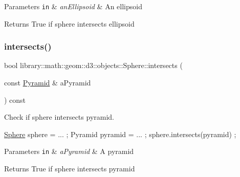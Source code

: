 \begin{DoxyParams}[1]{Parameters}
\mbox{\tt in}  & {\em an\+Ellipsoid} & An ellipsoid \\
\hline
\end{DoxyParams}
\begin{DoxyReturn}{Returns}
True if sphere intersects ellipsoid 
\end{DoxyReturn}
\mbox{\label{classlibrary_1_1math_1_1geom_1_1d3_1_1objects_1_1_sphere_a698e81554ca85819741fdfdcd123e8a1}} 
\subsubsection{\texorpdfstring{intersects()}{intersects()}\hspace{0.1cm}{\footnotesize\ttfamily [8/9]}}
{\footnotesize\ttfamily bool library\+::math\+::geom\+::d3\+::objects\+::\+Sphere\+::intersects (\begin{DoxyParamCaption}\item[{const \hyperlink{classlibrary_1_1math_1_1geom_1_1d3_1_1objects_1_1_pyramid}{Pyramid} \&}]{a\+Pyramid }\end{DoxyParamCaption}) const}



Check if sphere intersects pyramid. 


\begin{DoxyCode}
\hyperlink{classlibrary_1_1math_1_1geom_1_1d3_1_1objects_1_1_sphere_a55dccc8ea16ee55cd7694c26afa8ea39}{Sphere} sphere = ... ;
Pyramid pyramid = ... ;
sphere.intersects(pyramid) ;
\end{DoxyCode}



\begin{DoxyParams}[1]{Parameters}
\mbox{\tt in}  & {\em a\+Pyramid} & A pyramid \\
\hline
\end{DoxyParams}
\begin{DoxyReturn}{Returns}
True if sphere intersects pyramid 
\end{DoxyReturn}
\mbox{\label{classlibrary_1_1math_1_1geom_1_1d3_1_1objects_1_1_sphere_a64889a39d7df049b119bda0eb922f949}} 
